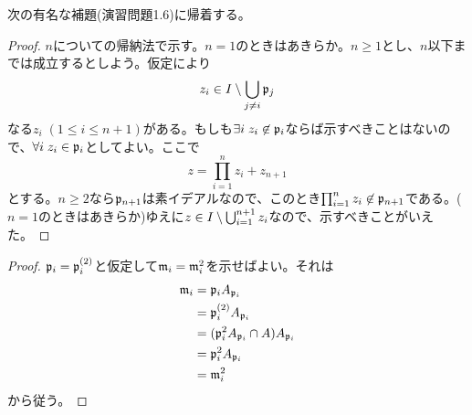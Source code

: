 \begin{rem}
  次の有名な補題(演習問題1.6)に帰着する。
  \begin{proof}
    $n$についての帰納法で示す。$n=1$のときはあきらか。$n \geq 1$とし、$n$以下までは成立するとしよう。仮定により
\[
z_i \in I \setminus \bigcup_{j \neq i} \mathfrak{p}_j
\]
なる$z_i \; (1 \leq i \leq n+1)$がある。もしも$\exists i \; z_i \not\in \mathfrak{p}_i$ならば示すべきことはないので、$\forall i \; z_i \in \mathfrak{p}_i$としてよい。ここで
\[
z = \prod_{i=1}^n z_i + z_{n+1}
\]
とする。$n \geq 2$なら$\mathfrak{p}_{n+1}$は素イデアルなので、このとき$\prod_{i=1}^n z_i \not\in \mathfrak{p}_{n+1}$である。($n =1$のときはあきらか)ゆえに$z \in I \setminus \bigcup_{i=1}^{n+1} z_{i}$なので、示すべきことがいえた。
  \end{proof}
\end{rem}



\begin{proof}
  $\mathfrak{p}_i = \mathfrak{p}_i^{(2)}$と仮定して$\mathfrak{m}_i = \mathfrak{m}_i^2$を示せばよい。それは
  \begin{align*}
    \mathfrak{m}_i &= \mathfrak{p}_i A_{\mathfrak{p}_i} \\
    &= \mathfrak{p}_i^{(2)} A_{\mathfrak{p}_i} \\
    &= (\mathfrak{p}_i^2 A_{\mathfrak{p}_i} \cap A) A_{\mathfrak{p}_i} \\
    &= \mathfrak{p}_i^2 A_{\mathfrak{p}_i} \\
    &= \mathfrak{m}_i^2
  \end{align*}
  から従う。
  \begin{comment}
  $R = R_i$, $\frakp = \frakp_i$, $\frakm = \frakm_i$として添え字を省略する。背理法で示す。$\frakp = \frakp^{(2)}$とする。$R$はDVRなので、$\frakm = wR$なる$w \in R$がある。よって$R = A_{\frakp}$により、$sw \in A$なる$s \in A \sm \frakp$がある。
  このとき$sw \in \frakm \cap A = \frakp$なので$sw \in \frakp_i^{(2)}$である。ここで$\frakp_i^{(2)} = \frakp^2 A_{\frakp} \cap A = \frakm^2 \cap A$であることから、$sw = w^2t$なる$t \in R$がある。このとき$s = wt$より、$s \in \frakm \cap A = \frakp$となって矛盾。
\end{comment}
\end{proof}



